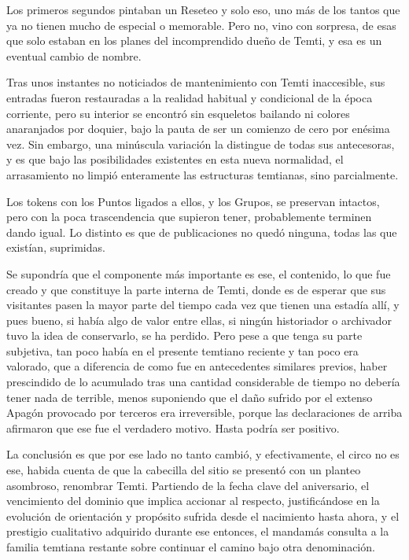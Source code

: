 \documentclass[
  spanish,
]{book}
\begin{document}
Los primeros segundos pintaban un Reseteo y solo eso, uno más de los tantos que ya no tienen mucho de especial o memorable. Pero no, vino con sorpresa, de esas que solo estaban en los planes del incomprendido dueño de Temti, y esa es un eventual cambio de nombre.

Tras unos instantes no noticiados de mantenimiento con Temti inaccesible, sus entradas fueron restauradas a la realidad habitual y condicional de la época corriente, pero su interior se encontró sin esqueletos bailando ni colores anaranjados por doquier, bajo la pauta de ser un comienzo de cero por enésima vez. Sin embargo, una minúscula variación la distingue de todas sus antecesoras, y es que bajo las posibilidades existentes en esta nueva normalidad, el arrasamiento no limpió enteramente las estructuras temtianas, sino parcialmente.

Los tokens con los Puntos ligados a ellos, y los Grupos, se preservan intactos, pero con la poca trascendencia que supieron tener, probablemente terminen dando igual. Lo distinto es que de publicaciones no quedó ninguna, todas las que existían, suprimidas.

Se supondría que el componente más importante es ese, el contenido, lo que fue creado y que constituye la parte interna de Temti, donde es de esperar que sus visitantes pasen la mayor parte del tiempo cada vez que tienen una estadía allí, y pues bueno, si había algo de valor entre ellas, si ningún historiador o archivador tuvo la idea de conservarlo, se ha perdido. Pero pese a que tenga su parte subjetiva, tan poco había en el presente temtiano reciente y tan poco era valorado, que a diferencia de como fue en antecedentes similares previos, haber prescindido de lo acumulado tras una cantidad considerable de tiempo no debería tener nada de terrible, menos suponiendo que el daño sufrido por el extenso Apagón provocado por terceros era irreversible, porque las declaraciones de arriba afirmaron que ese fue el verdadero motivo. Hasta podría ser positivo.

La conclusión es que por ese lado no tanto cambió, y efectivamente, el circo no es ese, habida cuenta de que la cabecilla del sitio se presentó con un planteo asombroso, renombrar Temti. Partiendo de la fecha clave del aniversario, el vencimiento del dominio que implica accionar al respecto, justificándose en la evolución de orientación y propósito sufrida desde el nacimiento hasta ahora, y el prestigio cualitativo adquirido durante ese entonces, el mandamás consulta a la familia temtiana restante sobre continuar el camino bajo otra denominación.
\end{document}
